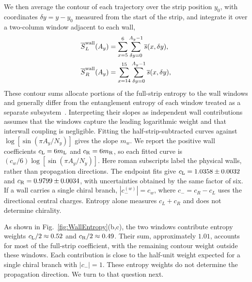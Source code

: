 \documentclass[aps,prb,10pt,twocolumn,superscriptaddress,longbibliography,floatfix]{revtex4-2}
\newcommand{\newtext}[1]{{\color{blue}#1}}
\begin{document}
{We then average the contour of each trajectory over the strip position $y_0$, with coordinates $\delta y=y-y_0$ measured from the start of the strip, and integrate it over a two-column window adjacent to each wall,
\begin{align}
    \overline{S}^{\rm wall}_{L}(A_y)&=\sum_{x=5}^{6}\sum_{\delta y=0}^{A_y-1}\overline{s}(x,\delta y),\nonumber\\
    \overline{S}^{\rm wall}_{R}(A_y)&=\sum_{x=14}^{15}\sum_{\delta y=0}^{A_y-1}\overline{s}(x,\delta y),
    \label{eq:WallEntropy}
\end{align}
These contour sums allocate portions of the full-strip entropy to the wall windows and generally differ from the entanglement entropy of each window treated as a separate subsystem~\cite{ChenVidal2014}. Interpreting their slopes as independent wall contributions assumes that the windows capture the leading logarithmic weight and that interwall coupling is negligible.
\newtext{Fitting the half-strip-subtracted curves against $\log[\sin(\pi A_y/N_y)]$ gives the slope $m_w$. We report the positive wall coefficients $c_{\rm L}=6m_{\rm L}$ and $c_{\rm R}=6m_{\rm R}$, so each fitted curve is $(c_w/6)\log[\sin(\pi A_y/N_y)]$. Here roman subscripts label the physical walls, rather than propagation directions. The endpoint fits give $c_{\rm L}=1.0358\pm0.0032$ and $c_{\rm R}=0.9799\pm0.0034$, with uncertainties obtained by the same factor of six. If a wall carries a single chiral branch, $|c_-^{(w)}|=c_w$, where $c_-=c_R-c_L$ uses the directional central charges. Entropy alone measures $c_L+c_R$ and does not determine chirality.}
}



\newtext{As shown in Fig.~\ref{fig:WallEntropy}(b,c), the two windows contribute entropy weights $c_{\rm L}/2\approx0.52$ and $c_{\rm R}/2\approx0.49$. Their sum, approximately $1.01$, accounts for most of the full-strip coefficient, with the remaining contour weight outside these windows. Each contribution is close to the half-unit weight expected for a single chiral branch with $|c_-|=1$.  These entropy weights do not determine the propagation direction. We turn to that question next.}
\end{document}
